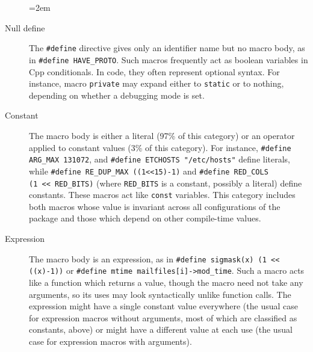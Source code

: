 \documentclass[10pt]{article}
\begin{document}
\begin{description}
  \sloppy
  \emergencystretch=2em

\item[Null define]  The {\tt \#define} directive gives only an
  identifier name but no macro body, as in {\tt \#define
  \verb|HAVE_PROTO|}\@.  Such macros frequently act as boolean variables in
Cpp conditionals.  In code, they often represent optional syntax.  For
instance, macro {\tt private} may expand either to {\tt static} or to
nothing, depending on whether a debugging mode is set.

\item[Constant] The macro body is either a literal (97\% of this category)
  or an operator applied to constant values (3\% of this category).  For
  instance, {\tt \#define \verb|ARG_MAX| 131072}, and {\tt \#define
  ETCHOSTS "/etc/hosts"} define literals, while {\tt \#define
\verb|RE_DUP_MAX| ((1<<15)-1)} and {\tt \#define \verb|RED_COLS| (1~<<~\verb|RED_BITS|)} (where \verb|RED_BITS| is a constant, possibly a literal)
define constants.  These macros act like {\tt const} variables.  This
category includes both macros whose value is invariant across all
configurations of the package and those which depend on other compile-time
values.


\item[Expression]  The macro body is an expression, as in {\tt \#define
  sigmask(x) (1 << ((x)-1))} or {\tt \#define mtime mailfiles[i]->\verb|mod_time|}.
Such a macro acts like a function which returns a value, though the
macro need not take any arguments, so its uses may look syntactically
unlike function calls. 
The expression might have a single constant value everywhere (the usual
case for expression macros without arguments, most of which are classified
as constants, above) or might have a different value at each use (the usual
case for expression macros with arguments).


\end{description}
\end{document}

